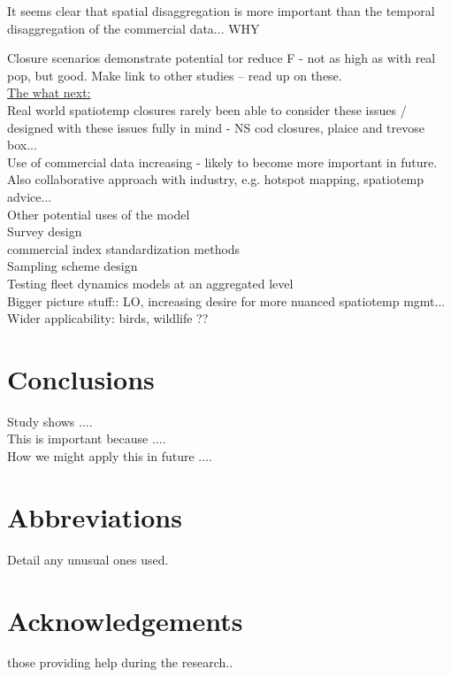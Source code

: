 \documentclass[review]{elsarticle}
\begin{document}
It seems clear that spatial disaggregation is more important than the temporal
disaggregation of the commercial data... WHY

Closure scenarios demonstrate potential tor reduce F - not as high as with real
pop, but good.  Make link to other studies -- read up on these. \\

\underline{The what next:} \\

Real world spatiotemp closures rarely been able to consider these issues /
designed with these issues fully in mind - NS cod closures, plaice and trevose
box... \\

Use of commercial data increasing - likely to become more important in future.
Also collaborative approach with industry, e.g. hotspot mapping, spatiotemp
advice... \\


Other potential uses of the model \\

Survey design \\

commercial index standardization methods \\

Sampling scheme design \\

Testing fleet dynamics models at an aggregated level \\

Bigger picture stuff::  LO, increasing desire for more nuanced spatiotemp
mgmt... Wider applicability: birds, wildlife ?? 

\section{Conclusions}

Study shows ....\\

This is important because .... \\

How we might apply this in future .... \\

\section*{Abbreviations} Detail any unusual ones used.

\section*{Acknowledgements} those providing help during the research..
\end{document}
